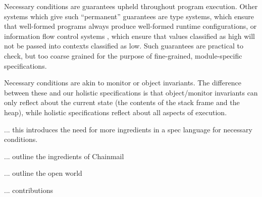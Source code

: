 Necessary conditions are guarantees upheld throughout program execution.
Other systems which give such ``permanent'' guarantees are    type systems, 
which ensure that well-formed programs  always produce well-formed runtime
configurations, or information flow control systems \cite{infflow}, which ensure that values 
classified as high  will not be passed into contexts classified as low. 
Such  guarantees %
 are  practical to check, but   too coarse grained
for the purpose of fine-grained,  module-specific specifications. 

Necessary conditions are  akin to  monitor or object invariants\cite{Hoare74,Meyer97}. The difference between
these and our holistic specifications is that object/monitor invariants can only reflect about 
the current state (\ie the contents of the
stack frame and the heap), while   holistic specifications reflect about all aspects of execution.

 

 
... this introduces the need for more ingredients in a spec language for necessary conditions.

... outline the ingredients of Chainmail

... outline the open world



... contributions

